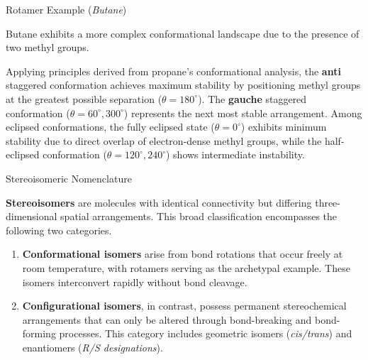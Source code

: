 \documentclass[10pt]{article}
\begin{document}
  \begin{core}{Rotamer Example (\textit{Butane})}
      
    Butane exhibits a more complex conformational landscape due to the presence of two methyl groups.

     
    Applying principles derived from propane's conformational analysis, the \textbf{anti} staggered conformation achieves maximum stability by positioning methyl groups at the greatest possible separation ($\theta = 180^{\circ}$). The \textbf{gauche} staggered conformation ($\theta = 60^{\circ}, 300^{\circ}$) represents the next most stable arrangement. Among eclipsed conformations, the fully eclipsed state ($\theta = 0^{\circ}$) exhibits minimum stability due to direct overlap of electron-dense methyl groups, while the half-eclipsed conformation ($\theta = 120^{\circ}, 240^{\circ}$) shows intermediate instability.


  \end{core}

  \begin{core}{Stereoisomeric Nomenclature}

    \textbf{Stereoisomers} are molecules with identical connectivity but differing three-dimensional spatial arrangements. This broad classification encompasses the following two categories.

    \begin{enumerate}

      \item \textbf{Conformational isomers} arise from bond rotations that occur freely at room temperature, with rotamers serving as the archetypal example. These isomers interconvert rapidly without bond cleavage.

      \item \textbf{Configurational isomers}, in contrast, possess permanent stereochemical arrangements that can only be altered through bond-breaking and bond-forming processes. This category includes geometric isomers (\textit{cis/trans}) and enantiomers (\textit{R/S designations}).

    \end{enumerate}
      
  \end{core}
\end{document}
